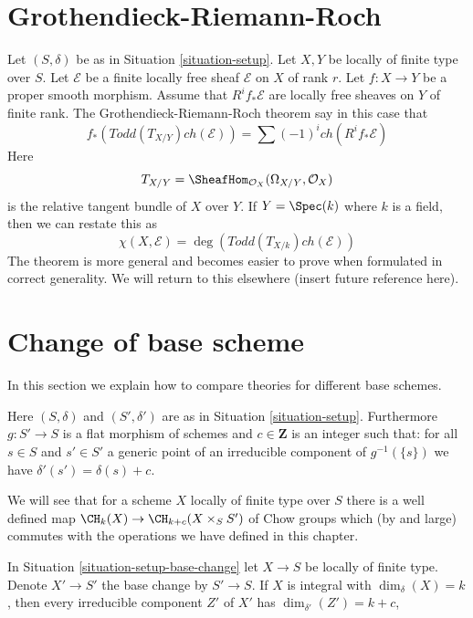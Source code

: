 \section{Grothendieck-Riemann-Roch}
\label{section-grr}

\noindent
Let $(S, \delta)$ be as in
Situation \ref{situation-setup}.
Let $X, Y$ be locally of finite type over $S$.
Let $\mathcal{E}$ be a finite locally free sheaf
${\mathcal E}$ on $X$ of rank $r$.
Let $f : X \to Y$ be a proper smooth morphism.
Assume that $R^if_*\mathcal{E}$ are locally free
sheaves on $Y$ of finite rank.
The Grothendieck-Riemann-Roch theorem say in this
case that
$$
f_*(Todd(T_{X/Y}) ch(\mathcal{E}))
=
\sum (-1)^i ch(R^if_*\mathcal{E})
$$
Here
$$
T_{X/Y} = \SheafHom_{\mathcal{O}_X}(\Omega_{X/Y}, \mathcal{O}_X)
$$
is the relative tangent bundle of $X$ over $Y$. If $Y = \Spec(k)$
where $k$ is a field, then we can restate this as
$$
\chi(X, \mathcal{E}) = \deg(Todd(T_{X/k}) ch(\mathcal{E}))
$$
The theorem is more general and becomes easier to prove
when formulated in correct generality. We will return to
this elsewhere (insert future reference here).







\section{Change of base scheme}
\label{section-change-base}

\noindent
In this section we explain how to compare theories for different
base schemes.

\begin{situation}
\label{situation-setup-base-change}
Here  $(S, \delta)$ and $(S', \delta')$ are as in
Situation \ref{situation-setup}. Furthermore $g : S' \to S$
is a flat morphism of schemes and $c \in \mathbf{Z}$
is an integer such that: for all $s \in S$ and $s' \in S'$
a generic point of an irreducible component of $g^{-1}(\{s\})$ we have
$\delta'(s') = \delta(s) + c$.
\end{situation}

\noindent
We will see that for a scheme $X$ locally of finite type over $S$
there is a well defined map $\CH_k(X) \to \CH_{k + c}(X \times_S S')$
of Chow groups which (by and large) commutes with the operations
we have defined in this chapter.

\begin{lemma}
\label{lemma-dimension-base-change}
In Situation \ref{situation-setup-base-change} let $X \to S$ be locally
of finite type. Denote $X' \to S'$ the base change by $S' \to S$.
If $X$ is integral with $\dim_\delta(X) = k$, then
every irreducible component $Z'$ of $X'$ has $\dim_{\delta'}(Z') = k + c$,
\end{lemma}


